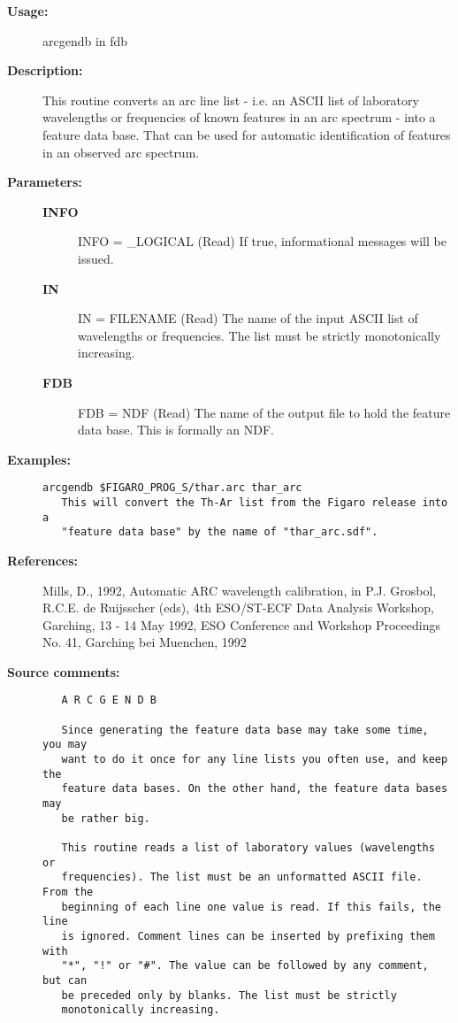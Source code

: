 \begin{description}

\item [{\bf Usage:}]

   arcgendb in fdb


\item [{\bf Description:}]
   This routine converts an arc line list - i.e. an ASCII list of
   laboratory wavelengths or frequencies of known features in an arc
   spectrum - into a feature data base. That can be used for
   automatic identification of features in an observed arc spectrum.


\item [{\bf Parameters:}]
\begin{description}
\item [{\bf INFO}]
INFO = _LOGICAL (Read)
   If true, informational messages will be issued.
\item [{\bf IN}]
IN = FILENAME (Read)
   The name of the input ASCII list of wavelengths or frequencies.
   The list must be strictly monotonically increasing.
\item [{\bf FDB}]
FDB = NDF (Read)
   The name of the output file to hold the feature data base.
   This is formally an NDF.
\end{description}

\item [{\bf Examples:}]
\begin{verbatim}
arcgendb $FIGARO_PROG_S/thar.arc thar_arc
   This will convert the Th-Ar list from the Figaro release into a
   "feature data base" by the name of "thar_arc.sdf".
\end{verbatim}

\item [{\bf References:}]
   Mills, D., 1992, Automatic ARC wavelength calibration, in P.J.
   Grosbol, R.C.E. de Ruijsscher (eds), 4th ESO/ST-ECF Data Analysis
   Workshop, Garching, 13 - 14 May 1992, ESO Conference and Workshop
   Proceedings No. 41, Garching bei Muenchen, 1992


\item [{\bf Source comments:}]
\begin{verbatim}
   A R C G E N D B

   Since generating the feature data base may take some time, you may
   want to do it once for any line lists you often use, and keep the
   feature data bases. On the other hand, the feature data bases may
   be rather big.

   This routine reads a list of laboratory values (wavelengths or
   frequencies). The list must be an unformatted ASCII file. From the
   beginning of each line one value is read. If this fails, the line
   is ignored. Comment lines can be inserted by prefixing them with
   "*", "!" or "#". The value can be followed by any comment, but can
   be preceded only by blanks. The list must be strictly
   monotonically increasing.


\end{verbatim}
\end{description}
